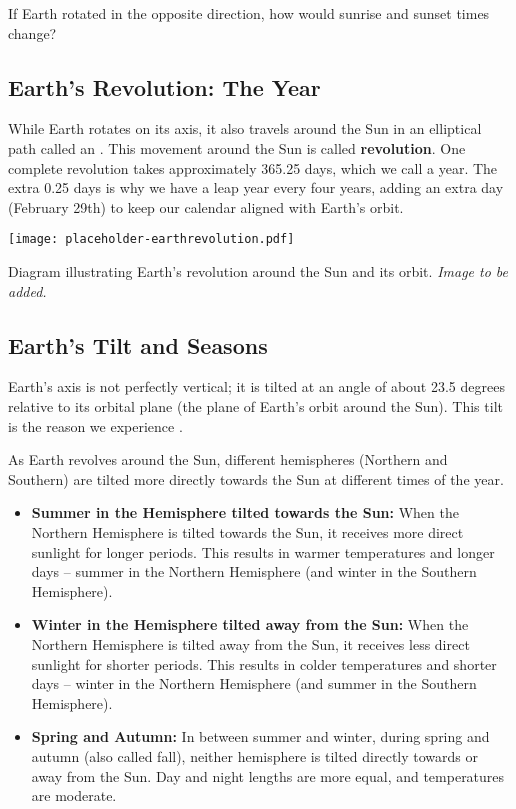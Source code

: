 \begin{stopandthink}
If Earth rotated in the opposite direction, how would sunrise and sunset times change?
\end{stopandthink}


\subsection{Earth's Revolution: The Year}

While Earth rotates on its axis, it also travels around the Sun in an elliptical path called an . This movement around the Sun is called \textbf{revolution}. One complete revolution takes approximately 365.25 days, which we call a year.  The extra 0.25 days is why we have a leap year every four years, adding an extra day (February 29th) to keep our calendar aligned with Earth's orbit.

\begin{marginfigure}
\texttt{[image: placeholder-earthrevolution.pdf]}
\caption{\label{fig:earthrevolution}Diagram illustrating Earth's revolution around the Sun and its orbit. \textit{Image to be added.}}
\end{marginfigure}


\subsection{Earth's Tilt and Seasons}

Earth's axis is not perfectly vertical; it is tilted at an angle of about 23.5 degrees relative to its orbital plane (the plane of Earth's orbit around the Sun). This tilt is the reason we experience .

As Earth revolves around the Sun, different hemispheres (Northern and Southern) are tilted more directly towards the Sun at different times of the year.

\begin{itemize}
    \item \textbf{Summer in the Hemisphere tilted towards the Sun:} When the Northern Hemisphere is tilted towards the Sun, it receives more direct sunlight for longer periods. This results in warmer temperatures and longer days – summer in the Northern Hemisphere (and winter in the Southern Hemisphere).
    \item \textbf{Winter in the Hemisphere tilted away from the Sun:} When the Northern Hemisphere is tilted away from the Sun, it receives less direct sunlight for shorter periods. This results in colder temperatures and shorter days – winter in the Northern Hemisphere (and summer in the Southern Hemisphere).
    \item \textbf{Spring and Autumn:} In between summer and winter, during spring and autumn (also called fall), neither hemisphere is tilted directly towards or away from the Sun.  Day and night lengths are more equal, and temperatures are moderate.
\end{itemize}

